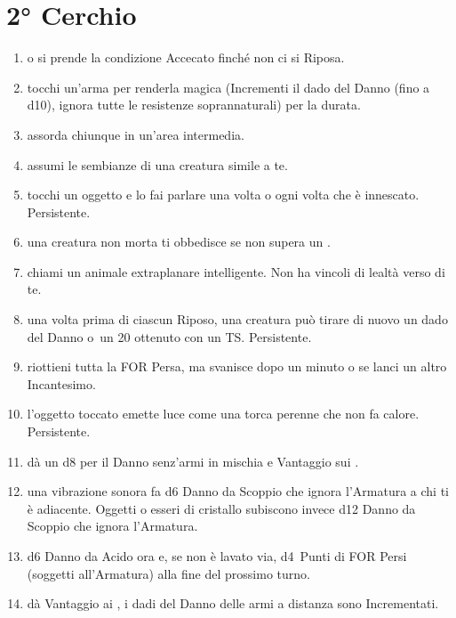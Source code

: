 \documentclass[itdr]{subfiles}
\begin{document}

\vfill
\break

\section{2° Cerchio}
\def \spellcircle {2}
\begin{enumerate}
	\item {}  o si prende la condizione Accecato finché non ci si Riposa.
	\item {} tocchi un'arma per renderla magica (Incrementi il dado del Danno (fino a d10), ignora tutte le resistenze soprannaturali) per la durata.
	\item {} assorda chiunque in un'area intermedia.
	\item {} assumi le sembianze di una creatura simile a te.
	\item {} tocchi un oggetto e lo fai parlare una volta o ogni volta che è innescato. Persistente.
	\item {} una creatura non morta ti obbedisce se non supera un .
	\item {} chiami un animale extraplanare intelligente. Non ha vincoli di lealtà verso di te.
	\item {} una volta prima di ciascun Riposo, una creatura può tirare di nuovo un dado del Danno o~un 20 ottenuto con un TS. Persistente.
	\item {} riottieni tutta la FOR Persa, ma svanisce dopo un minuto o se lanci un altro Incantesimo.
	\item {} l'oggetto toccato emette luce come una torca perenne che non fa calore. Persistente.
	\item {} dà un d8 per il Danno senz'armi in mischia e Vantaggio sui .
	\item {} una vibrazione sonora fa d6 Danno da Scoppio che ignora l'Armatura a chi ti è adiacente. Oggetti o esseri di cristallo subiscono invece d12 Danno da Scoppio che ignora l'Armatura.
	\item {} d6 Danno da Acido ora e, se non è lavato via, d4~Punti di FOR Persi (soggetti all'Armatura) alla fine del prossimo turno.
	\item {} dà Vantaggio ai , i dadi del Danno delle armi a distanza sono Incrementati.

\end{enumerate}
\end{document}

